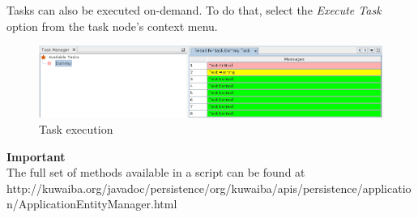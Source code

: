 \documentclass[a4paper]{article}
\begin{document}
		Tasks can also be executed on-demand. To do that, select the \textit{Execute Task} option from the task node's context menu.
		\begin{figure}[h!]
			\centering
			\includegraphics[width=1.1\linewidth]{img/task_manager_execute_task.png}
			\caption{Task execution}
			\label{fig:task_manager_execute_task}
		\end{figure}
		\begin{framed} {\large \textbf{Important}}\\
			The full set of methods available in a script can be found at \\ \tiny{http://kuwaiba.org/javadoc/persistence/org/kuwaiba/apis/persistence/application/ApplicationEntityManager.html}
		\end{framed}
	\newpage
\end{document}

